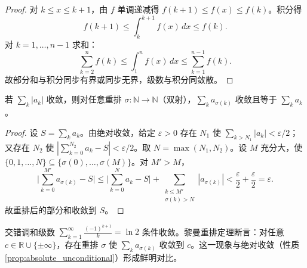 \begin{proof}
对 $k \le x \le k+1$，由 $f$ 单调递减得 $f(k+1) \le f(x) \le f(k)$。积分得
\[
f(k+1) \le \int_k^{k+1} f(x)\,dx \le f(k).
\]
对 $k = 1, \dots, n-1$ 求和：
\[
\sum_{k=2}^{n} f(k) \le \int_1^n f(x)\,dx \le \sum_{k=1}^{n-1} f(k).
\]
故部分和与积分同步有界或同步无界，级数与积分同敛散。
\end{proof}

\begin{property}[绝对收敛蕴含无条件收敛]\label{prop:absolute_unconditional}
若 $\sum_k |a_k|$ 收敛，则对任意重排 $\sigma: \mathbb{N} \to \mathbb{N}$（双射），$\sum_k a_{\sigma(k)}$ 收敛且等于 $\sum_k a_k$。
\end{property}

\begin{proof}
设 $S = \sum_k a_k$。由绝对收敛，给定 $\varepsilon > 0$ 存在 $N_1$ 使 $\sum_{k > N_1} |a_k| < \varepsilon/2$；又存在 $N_2$ 使 $|\sum_{k=0}^{N_2} a_k - S| < \varepsilon/2$。取 $N = \max(N_1, N_2)$。设 $M$ 充分大，使 $\{0, 1, \dots, N\} \subseteq \{\sigma(0), \dots, \sigma(M)\}$。对 $M' > M$，
\[
\Big| \sum_{k=0}^{M'} a_{\sigma(k)} - S \Big| \le \Big| \sum_{k=0}^{N} a_k - S \Big| + \sum_{\substack{k \le M' \\ \sigma(k) > N}} |a_{\sigma(k)}| < \frac{\varepsilon}{2} + \frac{\varepsilon}{2} = \varepsilon.
\]
故重排后的部分和收敛到 $S$。
\end{proof}

\begin{example}[条件收敛的重排可以改变和]\label{ex:riemann_rearrangement}
交错调和级数 $\sum_{k=1}^{\infty} \frac{(-1)^{k+1}}{k} = \ln 2$ 条件收敛。黎曼重排定理断言：对任意 $c \in \mathbb{R} \cup \{\pm\infty\}$，存在重排 $\sigma$ 使 $\sum_k a_{\sigma(k)}$ 收敛到 $c$。这一现象与绝对收敛（性质 \ref{prop:absolute_unconditional}）形成鲜明对比。
\end{example}

